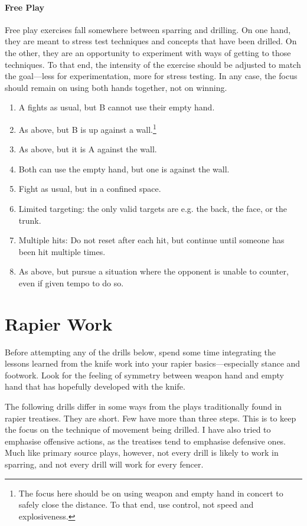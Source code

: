 \documentclass[article, 12pt, a4paper]{memoir}
\begin{document}
\subsubsection*{Free Play}
Free play exercises fall somewhere between sparring and drilling.
On one hand, they are meant to stress test techniques and concepts that have been drilled.
On the other, they are an opportunity to experiment with ways of getting to those techniques.
To that end, the intensity of the exercise should be adjusted to match the goal---less for experimentation, more for stress testing.
In any case, the focus should remain on using both hands together, not on winning.

\begin{enumerate}
    \item A fights as usual, but B cannot use their empty hand.
    \item As above, but B is up against a wall.\footnote{The focus here should be on using weapon and empty hand in concert to safely close the distance. To that end, use control, not speed and explosiveness.}
    \item As above, but it is A against the wall.
    \item Both can use the empty hand, but one is against the wall.
    \item Fight as usual, but in a confined space.
    \item Limited targeting: the only valid targets are e.g. the back, the face, or the trunk.
    \item Multiple hits: Do not reset after each hit, but continue until someone has been hit multiple times.
    \item As above, but pursue a situation where the opponent is unable to counter, even if given tempo to do so.
\end{enumerate}

\chapter{Rapier Work}
Before attempting any of the drills below, spend some time integrating the lessons learned from the knife work into your rapier basics---especially stance and footwork.
Look for the feeling of symmetry between weapon hand and empty hand that has hopefully developed with the knife.

The following drills differ in some ways from the plays traditionally found in rapier treatises.
They are short.
Few have more than three steps.
This is to keep the focus on the technique of movement being drilled.
I have also tried to emphasise offensive actions, as the treatises tend to emphasise defensive ones.
Much like primary source plays, however, not every drill is likely to work in sparring, and not every drill will work for every fencer.
\end{document}
